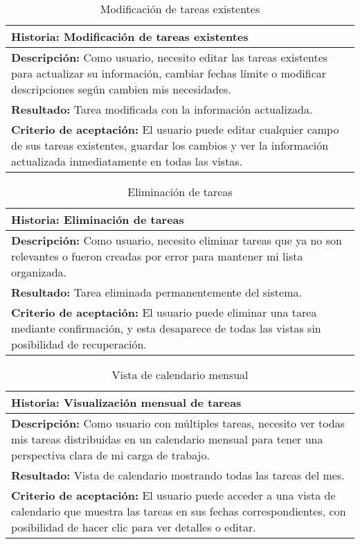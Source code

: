 \documentclass[11pt]{article}
\begin{document}
\begin{table}[H]
    \centering
    \begin{tabular}{|p{15cm}|}
    \hline
    \textbf{Historia: } Modificación de tareas existentes\\
    \hline
    \textbf{Descripción: }Como usuario, necesito editar las tareas existentes para actualizar su información, cambiar fechas límite 
    o modificar descripciones según cambien mis necesidades.\\
    \hline
    \textbf{Resultado: }Tarea modificada con la información actualizada.\\
    \hline
    \textbf{Criterio de aceptación: } El usuario puede editar cualquier campo de sus tareas existentes, guardar los cambios y ver la 
    información actualizada inmediatamente en todas las vistas.\\
    \hline
    \end{tabular}
    \caption{Modificación de tareas existentes}
    \label{user-story2}
\end{table}

\begin{table}[H]
    \centering
    \begin{tabular}{|p{15cm}|}
    \hline
    \textbf{Historia: } Eliminación de tareas\\
    \hline
    \textbf{Descripción: }Como usuario, necesito eliminar tareas que ya no son relevantes o fueron 
    creadas por error para mantener mi lista organizada.\\
    \hline
    \textbf{Resultado: } Tarea eliminada permanentemente del sistema.\\
    \hline
    \textbf{Criterio de aceptación: }El usuario puede eliminar una tarea mediante confirmación, y esta 
    desaparece de todas las vistas sin posibilidad de recuperación.\\
    \hline
    \end{tabular}
    \caption{Eliminación de tareas}
    \label{user-story3}
\end{table}

\begin{table}[H]
    \centering
    \begin{tabular}{|p{15cm}|}
    \hline
    \textbf{Historia: } Visualización mensual de tareas\\
    \hline
    \textbf{Descripción: }Como usuario con múltiples tareas, necesito ver todas mis tareas distribuidas en un calendario mensual 
    para tener una perspectiva clara de mi carga de trabajo.\\
    \hline
    \textbf{Resultado: } Vista de calendario mostrando todas las tareas del mes.\\
    \hline
    \textbf{Criterio de aceptación: }El usuario puede acceder a una vista de calendario que muestra las tareas en sus fechas 
    correspondientes, con posibilidad de hacer clic para ver detalles o editar.\\
    \hline
    \end{tabular}
    \caption{Vista de calendario mensual}
    \label{user-story3}
\end{table}
\end{document}
